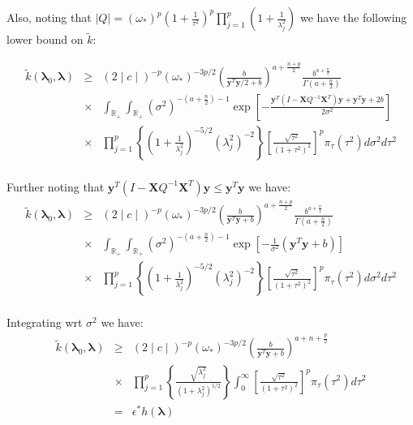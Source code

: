 \documentclass[noinfoline,11pt]{imsart}
\numberwithin{equation}{section}
\theoremstyle{plain}
\newcommand{\y}{\mathbf{y}}
\newcommand{\X}{\mathbf{X}}
\newcommand{\bl}{\boldsymbol{\lambda}}
\begin{document}
\noindent
Also, noting that $\mid Q\mid=(\omega_*)^p\left(1+\frac{1}{\tau^2}\right)^p\prod\limits_{j=1}^p\left(1+\frac{1}{\lambda_j^2}\right)$ we have the following lower bound on $\tilde k$:

\begin{eqnarray*}
\tilde k\left(\bl_0,\bl\right) &\geq& (2\mid c\mid)^{-p}\left(\omega_*\right)^{-3p/2}\left(\frac{b}{\y^T\y/2+b}\right)^{a+\frac{n+p}{2}}\frac{b^{a+\frac{n}{2}}}{\Gamma\left(a+\frac{n}{2}\right)} \nonumber \\
&\times& \int_{\mathbb{R}_+}\int_{\mathbb{R}_+}
\left(\sigma^2\right)^{-\left(a+\frac{n}{2}\right)-1}\exp{\left[-\frac{\y^T\left(I-\X Q^{-1}\X^T\right)\y+\y^T\y+2b}{2\sigma^2}\right]} \nonumber \\
&\times& \prod_{j=1}^p\left\{\left(1+\frac{1}{\lambda_j^2}\right)^{-5/2}\left(\lambda_j^2\right)^{-2}\right\}\left[\frac{\sqrt{\tau^2}}{\left(1+\tau^2\right)^2}\right]^{p}\pi_\tau\left(\tau^2\right)d\sigma^2d\tau^2\nonumber \\
\end{eqnarray*}

\noindent
Further noting that $\y^T\left(I-\X Q^{-1}\X^T\right)\y\leq \y^T\y$ we have:
\begin{eqnarray*}
\tilde k\left(\bl_0,\bl\right) &\geq& (2\mid c\mid)^{-p}\left(\omega_*\right)^{-3p/2}\left(\frac{b}{\y^T\y+b}\right)^{a+\frac{n+p}{2}}\frac{b^{a+\frac{n}{2}}}{\Gamma\left(a+\frac{n}{2}\right)} \nonumber \\
&\times& \int_{\mathbb{R}_+}\int_{\mathbb{R}_+}
\left(\sigma^2\right)^{-\left(a+\frac{n}{2}\right)-1}\exp{\left[-\frac{1}{\sigma^2}(\y^T\y+b)\right]} \nonumber \\
&\times& \prod_{j=1}^p\left\{\left(1+\frac{1}{\lambda_j^2}\right)^{-5/2}\left(\lambda_j^2\right)^{-2}\right\}\left[\frac{\sqrt{\tau^2}}{\left(1+\tau^2\right)^2}\right]^{p}\pi_\tau\left(\tau^2\right) d\sigma^2d\tau^2\nonumber \\
\end{eqnarray*}

\noindent
Integrating wrt $\sigma^2$ we have:
\begin{eqnarray*}
\tilde k\left(\bl_0,\bl\right) &\geq& (2\mid c\mid)^{-p}\left(\omega_*\right)^{-3p/2}\left(\frac{b}{\y^T\y+b}\right)^{a+n+\frac{p}{2}} \nonumber \\
&\times&\prod_{j=1}^p\left\{\frac{\sqrt{\lambda_j^2}}{\left(1+\lambda_j^2\right)^{5/2}}\right\}\int_0^{\infty}\left[\frac{\sqrt{\tau^2}}{\left(1+\tau^2\right)^2}\right]^{p}\pi_\tau\left(\tau^2\right)d\tau^2\nonumber \\
&=& \epsilon^* h\left(\bl\right) \nonumber \\
\end{eqnarray*}
\end{document}
